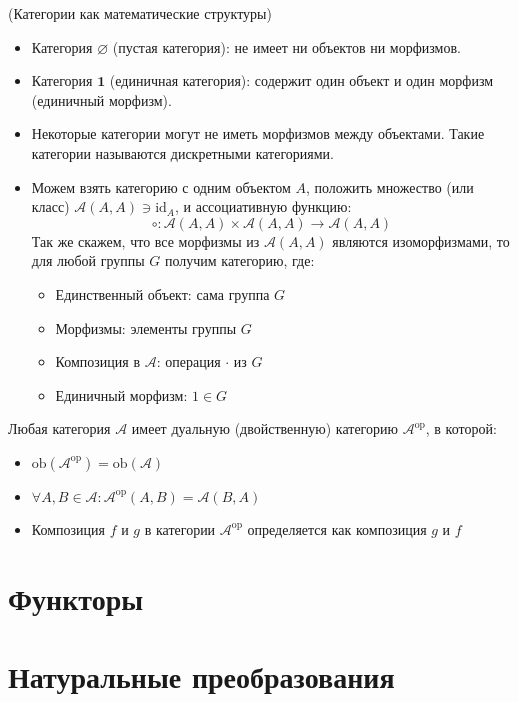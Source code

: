 \documentclass[document]{subfiles}
\begin{document}
\begin{example}(Категории как математические структуры)
    \begin{itemize}
        \item Категория $\mathbf{\varnothing}$ (пустая категория): не имеет ни объектов ни морфизмов.
        \item Категория $\mathbf{1}$ (единичная категория): содержит один объект и один морфизм (единичный морфизм).
        \item Некоторые категории могут не иметь морфизмов между объектами. Такие категории называются дискретными категориями.
        \item Можем взять категорию с одним объектом $A$, положить множество (или класс) $\mathcal{A}(A,A) \ni \text{id}_A$, и ассоциативную функцию:
            \[\circ : \mathcal{A}(A,A) \times \mathcal{A}(A,A) \to \mathcal{A}(A,A)\]
            Так же скажем, что все морфизмы из $\mathcal{A}(A,A)$ являются изоморфизмами, то для любой группы $G$ получим категорию, где:
            \begin{itemize}
                \item Единственный объект: сама группа $G$
                \item Морфизмы: элементы группы $G$
                \item Композиция в $\mathcal{A}$: операция $\cdot$ из $G$
                \item Единичный морфизм: $1 \in G$
            \end{itemize}
    \end{itemize}
\end{example}

\begin{definition}
    Любая категория $\mathcal{A}$ имеет дуальную (двойственную) категорию $\mathcal{A}^{\text{op}}$, в которой:
    \begin{itemize}
        \item $\text{ob}(\mathcal{A}^{\text{op}}) = \text{ob}(\mathcal{A})$
        \item $\forall A, B \in \mathcal{A} : \mathcal{A}^{\text{op}}(A, B) = \mathcal{A}(B,A)$
        \item Композиция $f$ и $g$ в категории $\mathcal{A}^{\text{op}}$ определяется как композиция $g$ и $f$
    \end{itemize}
\end{definition}

\section{Функторы}

\section{Натуральные преобразования}
\end{document}
